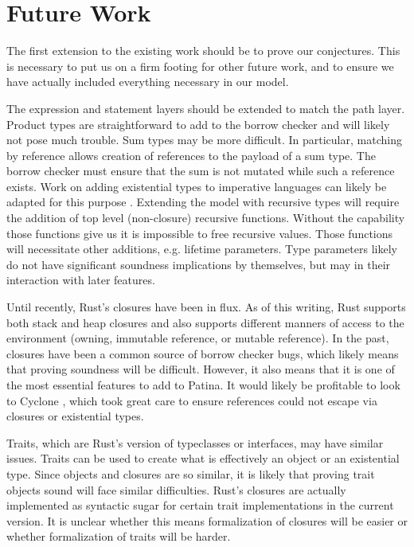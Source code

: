 \section*{Future Work}
The first extension to the existing work should be to prove our conjectures.
This is necessary to put us on a firm footing for other future work, and
to ensure we have actually included everything necessary in our model.

The expression and statement layers should be extended to match the path layer.
Product types are straightforward to add to the borrow checker and will likely not
pose much trouble. Sum types may be more difficult. In particular, matching by
reference allows creation of references to the payload of a sum type.
The borrow checker must ensure that the sum is not mutated while such a reference
exists. 
Work on adding existential types to imperative languages can likely be adapted
for this purpose \cite{existentials}.
Extending the model with recursive types will require the addition of
top level (non-closure) recursive functions. Without the capability those functions
give us it is impossible to free recursive values. Those functions will necessitate
other additions, e.g. lifetime parameters. Type parameters likely do not have
significant soundness implications by themselves, but may in their interaction with
later features.

Until recently, Rust's closures have been in flux. As of this writing, Rust supports
both stack and heap closures and also supports different manners of access to the environment
(owning, immutable reference, or mutable reference). In the past, closures have been a
common source of borrow checker bugs, which likely means that proving soundness will be
difficult. However, it also means that it is one of the most essential features to add to Patina.
It would likely be profitable to look to Cyclone \cite{cycregions}, which took great
care to ensure references could not escape via closures or existential types.

Traits, which are Rust's version of typeclasses or interfaces, may have similar issues.
Traits can be used to create what is effectively an object or an existential type.
Since objects and closures are so similar, it is likely that proving trait objects sound
will face similar difficulties. Rust's closures are actually implemented as syntactic sugar
for certain trait implementations in the current version. 
It is unclear whether this means formalization of closures will be easier
or whether formalization of traits will be harder.

